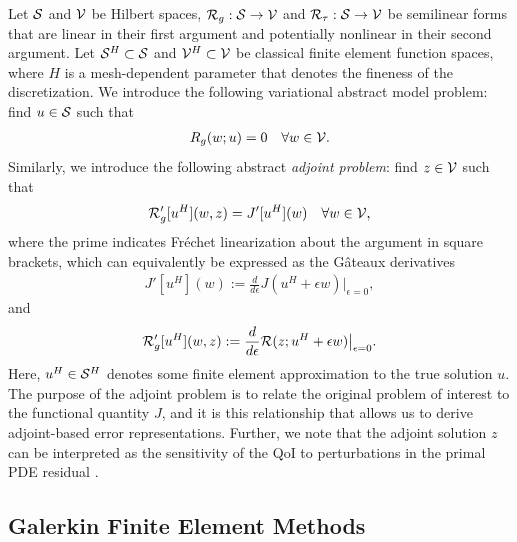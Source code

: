 Let $\S$ and $\V$ be Hilbert spaces, $\R_g : \S \to \V$ and
$\R_{\tau} : \S \to \V$ be semilinear forms that are linear in their first
argument and potentially nonlinear in their second argument. Let
$\S^H \subset \S$ and $\V^H \subset \V$ be classical finite element
function spaces, where $H$ is a mesh-dependent parameter that denotes the
fineness of the discretization. We introduce the following variational
abstract model problem: find $u \in \S$ such that
%
\begin{gather}
R_g(w; u) = 0 \quad \forall w \in \V.
\label{eq:aut_abstract_primal}
\end{gather}
%
Similarly, we introduce the following abstract \emph{adjoint problem}:
find $z \in \V$ such that
%
\begin{gather}
\R_g'[u^H](w, z) = J'[u^H](w) \quad \forall w \in \V,
\label{eq:aut_abstract_adjoint}
\end{gather}
%
where the prime indicates Fr\'{e}chet linearization about the argument in
square brackets, which can equivalently be expressed as the G\^{a}teaux
derivatives
%
\begin{gather}
J'[u^H](w) :=
\frac{d}{d \epsilon} J(u^H + \epsilon w) \bigr|_{\epsilon = 0},
\end{gather}
%
and
%
\begin{gather}
\R_g'[u^H](w, z) :=
\frac{d}{d \epsilon} \R(z; u^H + \epsilon w) \bigr|_{\epsilon = 0}.
\end{gather}
%
Here, $u^H \in \S^H$ denotes some finite element approximation to the
true solution $u$. The purpose of the adjoint problem is to relate the
original problem of interest to the functional quantity $J$, and it is this
relationship that allows us to derive adjoint-based error representations.
Further, we note that the adjoint solution $z$ can be interpreted as
the sensitivity of the QoI to perturbations in the primal PDE residual
\cite{fidkowski2011review}.

\subsection{Galerkin Finite Element Methods}

